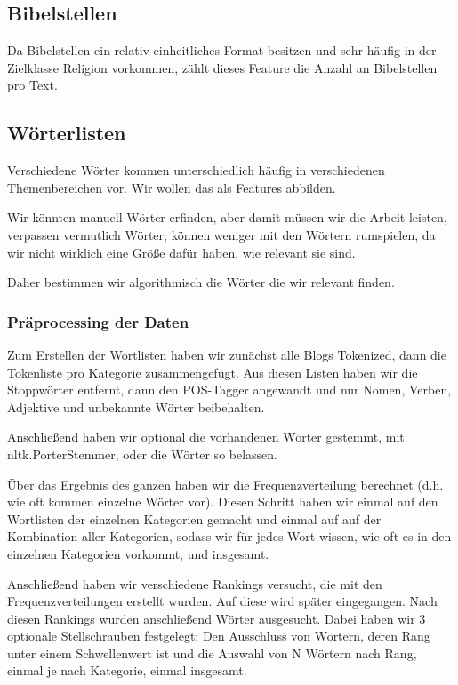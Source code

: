 \documentclass[
	11pt,
	a4paper
]{scrartcl}
\begin{document}
\subsection{Bibelstellen}\label{bibelstellen}
Da Bibelstellen ein relativ einheitliches Format besitzen und sehr häufig in der Zielklasse Religion vorkommen, zählt dieses Feature die Anzahl an Bibelstellen
pro Text.

\subsection{Wörterlisten}\label{woerterlisten}
Verschiedene Wörter kommen unterschiedlich häufig in verschiedenen Themenbereichen vor. Wir wollen das als Features abbilden.

Wir könnten manuell Wörter erfinden, aber damit müssen wir die Arbeit leisten, verpassen vermutlich Wörter, 
können weniger mit den Wörtern rumspielen, da wir nicht wirklich eine Größe dafür haben, wie relevant sie sind.

Daher bestimmen wir algorithmisch die Wörter die wir relevant finden.

\subsubsection{Präprocessing der Daten}

Zum Erstellen der Wortlisten haben wir zunächst alle Blogs Tokenized, dann die Tokenliste pro Kategorie zusammengefügt. 
Aus diesen Listen haben wir die Stoppwörter entfernt, dann den POS-Tagger angewandt und nur Nomen, Verben, Adjektive und unbekannte Wörter beibehalten.

Anschließend haben wir optional die vorhandenen Wörter gestemmt, mit nltk.PorterStemmer, oder die Wörter so belassen. 

Über das Ergebnis des ganzen haben wir die Frequenzverteilung berechnet (d.h. wie oft kommen einzelne Wörter vor). 
Diesen Schritt haben wir einmal auf den Wortlisten der einzelnen Kategorien gemacht und einmal auf auf der Kombination aller Kategorien, 
sodass wir für jedes Wort wissen, wie oft es in den einzelnen Kategorien vorkommt, und insgesamt.

Anschließend haben wir verschiedene Rankings versucht, die mit den Frequenzverteilungen erstellt wurden. 
Auf diese wird später eingegangen. Nach diesen Rankings wurden anschließend Wörter ausgesucht. 
Dabei haben wir 3 optionale Stellschrauben festgelegt: Den Ausschluss von Wörtern, 
deren Rang unter einem Schwellenwert ist und die Auswahl von N Wörtern nach Rang, einmal je nach Kategorie, einmal insgesamt.
\end{document}
